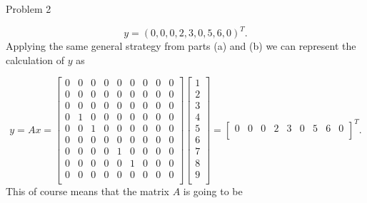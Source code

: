 \begin{problem}{Problem 2}
\begin{Highlight}
        \setcounter{equation}{0}
        \begin{equation}
            y = (0,0,0,2,3,0,5,6,0)^{T}.
        \end{equation}
        Applying the same general strategy from parts (a) and (b) we can represent the calculation of $y$ as

        \begin{equation}
            y = Ax = 
            \begin{bmatrix}
                0 & 0 & 0 & 0 & 0 & 0 & 0 & 0 & 0 \\
                0 & 0 & 0 & 0 & 0 & 0 & 0 & 0 & 0 \\
                0 & 0 & 0 & 0 & 0 & 0 & 0 & 0 & 0 \\
                0 & 1 & 0 & 0 & 0 & 0 & 0 & 0 & 0 \\
                0 & 0 & 1 & 0 & 0 & 0 & 0 & 0 & 0 \\
                0 & 0 & 0 & 0 & 0 & 0 & 0 & 0 & 0 \\
                0 & 0 & 0 & 0 & 1 & 0 & 0 & 0 & 0 \\
                0 & 0 & 0 & 0 & 0 & 1 & 0 & 0 & 0 \\
                0 & 0 & 0 & 0 & 0 & 0 & 0 & 0 & 0 \\
            \end{bmatrix}
            \begin{bmatrix}
                1 \\
                2 \\
                3 \\
                4 \\
                5 \\
                6 \\
                7 \\
                8 \\
                9 \\
            \end{bmatrix}
            = 
            \begin{bmatrix}
                0 & 0 & 0 & 2 & 3 & 0 & 5 & 6 & 0 \\
            \end{bmatrix}^{T}.
        \end{equation}
        This of course means that the matrix $A$ is going to be


\end{Highlight}
\end{problem}
